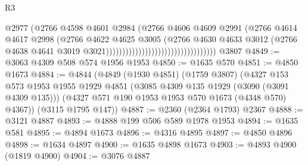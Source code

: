 \begin{lexlean}{R3}
\begin{coremodule}
                                                            @2977
                                                            (@2766
                                                              @4598
                                                              @4601
                                                              @2984
                                                              (@2766
                                                                @4606
                                                                @4609
                                                                @2991
                                                                (@2766
                                                                  @4614
                                                                  @4617
                                                                  @2998
                                                                  (@2766
                                                                    @4622
                                                                    @4625
                                                                    @3005
                                                                    (@2766
                                                                      @4630
                                                                      @4633
                                                                      @3012
                                                                      (@2766
                                                                        @4638
                                                                        @4641
                                                                        @3019
                                                                        @3021))))))))))))))))))))))))))))))))))
    @3807
@4849 := @3063 @4309 @508 @574 @1956 @1953
@4850 := @1635 @570
@4851 := @4850 @1673
@4884 := @4844
    (@4849
      (@1930 @4851)
      (@1759 @3807)
      (@4327
        @153
        @573
        @1953
        @1955
        @1929
        @4851
        (@3085 @4309 @135 @1929 (@3090 (@3091 @4309 @135)))
        (@4327 @571 @190 @1953 @1953 @570 @1673 (@4348 @570) @4367))
      (@3115 @1795 @147))
@4887 := @2360 (@2364 @1793) @2367
@4888 := @3121 @4887
@4893 := @4888 @199 @506 @589 @1978 @1953
@4894 := @1635 @581
@4895 := @4894 @1673
@4896 := @4316 @4895
@4897 := @4850 @4896
@4898 := @1634 @4897
@4900 := @1635 @4898 @1673
@4903 := @4893 @4900 (@1819 @4900)
@4904 := @3076 @4887

\end{coremodule}
\end{lexlean}
